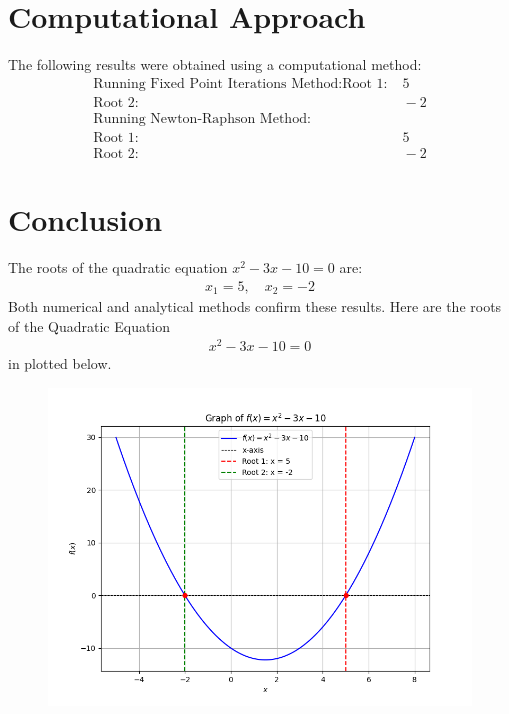 \documentclass[journal]{IEEEtran}
\begin{document}
\section*{Computational Approach}
The following results were obtained using a computational method:
\begin{align*}
\text{Running Fixed Point Iterations Method:} 
\text{Root 1:} & \; 5 \\
\text{Root 2:} & \; -2 \\
\text{Running Newton-Raphson Method:} & \\
\text{Root 1:} & \; 5 \\
\text{Root 2:} & \; -2
\end{align*}


\section*{Conclusion}
The roots of the quadratic equation \( x^2 - 3x - 10 = 0 \) are:
\begin{align}
    x_1 = 5, \quad x_2 = -2
\end{align}
Both numerical and analytical methods confirm these results.
Here are the roots of the Quadratic Equation 
\begin{align}
    x^2 - 3x - 10 = 0
\end{align} in plotted below.\\

\begin{figure}[h!]
   \centering
   \includegraphics[width=0.7\columnwidth]{figs/fig.png}
\end{figure}
\end{document}
